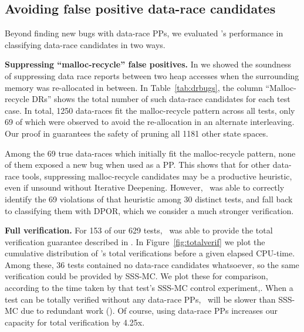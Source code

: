 %


\subsection{Avoiding false positive data-race candidates}
\label{sec:eval-falsepos}

Beyond finding new bugs with data-race PPs, we evaluated \quicksand's performance in classifying data-race candidates in two ways.

{\bf Suppressing ``malloc-recycle'' false positives.}
In \sect{\ref{sec:recycle}} we showed the soundness of suppressing data race reports between two heap accesses when the surrounding memory was re-allocated in between.
In Table~\ref{tab:drbugs}, the column ``Malloc-recycle DRs'' shows the total number of such data-race candidates for each test case.
In total, 1250 data-races fit the malloc-recycle pattern across all tests,
only 69 of which were observed to avoid the re-allocation in an alternate interleaving.
Our proof in \sect{\ref{sec:recycle}} guarantees the safety of pruning all 1181 other state spaces.

Among the 69 true data-races which initially fit the malloc-recycle pattern,
none of them exposed a new bug when used as a PP.
This shows that for other data-race tools,
suppressing malloc-recycle candidates may be a productive heuristic,
even if unsound without Iterative Deepening.
However, \quicksand~was able to correctly identify the 69 violations of that heuristic among 30 distinct tests,
and fall back to classifying them with DPOR,
which we consider a much stronger verification.

{\bf Full verification.}
For 153 of our 629 tests, \quicksand~was able to provide the total verification guarantee described in \sect{\ref{sec:totalverif}}.
In Figure~\ref{fig:totalverif} we plot the cumulative distribution of \quicksand's total verifications before a given elapsed CPU-time.
Among these, 36 tests contained no data-race candidates whatsoever, 
so the same verification could be provided by SSS-MC.
We plot these for comparison,
according to the time taken by that test's SSS-MC control experiment,.
When a test can be totally verified without any data-race PPs,
\quicksand~will be slower than SSS-MC due to redundant work (\sect{\ref{sec:future}}).
Of course, using data-race PPs increases our capacity for total verification by 4.25x.

